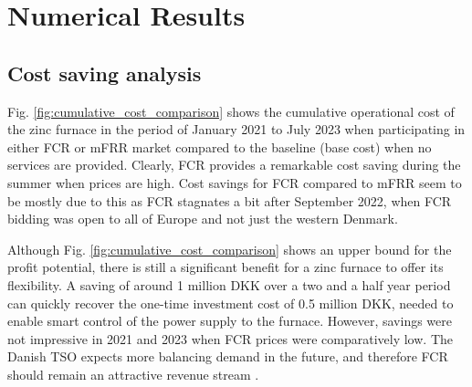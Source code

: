 \documentclass[conference]{IEEEtran}
\begin{document}

\vspace{2mm}
\section{Numerical Results}
\label{results}
\vspace{-1mm}
\subsection{Cost saving analysis}
\vspace{-1mm}
Fig. \ref{fig:cumulative_cost_comparison} shows the cumulative operational cost of the zinc furnace in the period of January 2021 to July 2023 when participating in either FCR or mFRR market compared to the baseline (base cost) when no services are provided. Clearly, FCR provides a remarkable cost saving during the summer when prices are high. Cost savings for FCR compared to mFRR seem to be mostly due to this as FCR stagnates a bit after September 2022, when FCR bidding was open to all of Europe and not just the western Denmark.

Although Fig. \ref{fig:cumulative_cost_comparison} shows an upper bound for the profit potential, there is still a significant benefit for a zinc furnace to offer its flexibility. A saving of around 1 million DKK over a two and a half year period can quickly recover the one-time investment cost of 0.5 million DKK, needed to enable smart control of the power supply to the furnace. However, savings were not impressive in 2021 and 2023 when FCR prices were comparatively low. The Danish TSO expects more balancing demand in the future, and therefore FCR should remain an attractive revenue stream \cite{energinet:scenario_report_2022}.
\end{document}
